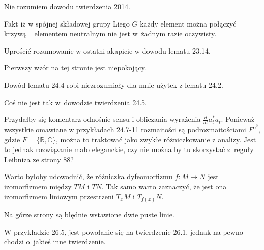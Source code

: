 \documentclass[a4paper,11pt]{article}
\begin{document}
\start {} Nie rozumiem dowodu twierdzenia 2014.

\vspace{\spaceFour}


\start {} Fakt iż w spójnej składowej grupy Liego $ G $ każdy
element można połączyć krzywą ~ elementem neutralnym nie jest w~żadnym
razie oczywisty.

\vspace{\spaceFour}


\start {} Uprościć rozumowanie w ostatni akapicie w dowodu
lematu 23.14.

\vspace{\spaceFour}


\start {} Pierwszy wzór na tej stronie jest niepokojący.

\vspace{\spaceFour}


\start {} Dowód lematu 24.4 robi niezrozumiały dla mnie użytek
z lematu 24.2.

\vspace{\spaceFour}


\start {} Coś nie jest tak w~dowodzie twierdzenia 24.5.

\vspace{\spaceFour}


\start {} Przydałby się komentarz odnośnie sensu i obliczania
wyrażenia $\frac{ d }{ dt } a^{ * }_{ t } a_{ t }$. Ponieważ wszystkie
omawiane w przykładach 24.7-11 rozmaitości są podrozmaitościami
$F^{ n^{ 2 } }$, gdzie $F = \{ \mathbb{ R }, \mathbb{ C } \}$, można
to traktować jako zwykłe różniczkowanie z analizy. Jest to jednak
rozwiązanie mało eleganckie, czy nie można by tu skorzystać z~reguły
Leibniza ze strony 88?

\vspace{\spaceFour}


\start Warto byłoby udowodnić, że różniczka dyfeomorfizmu
$f : M \to N$ jest izomorfizmem między $TM$ i $TN$. Tak samo
warto zaznaczyć, że jest ona izomorfizmem liniowym przestrzeni
$T_{ x }M$ i $T_{ f( x ) }N$.

\vspace{\spaceFour}


\start {} Na górze strony są błędnie wstawione dwie puste
linie.

\vspace{\spaceFour}


\start {} W przykładzie 26.5, jest powołanie się na twierdzenie
26.1, jednak na pewno chodzi o~jakieś inne twierdzenie.
\end{document}
